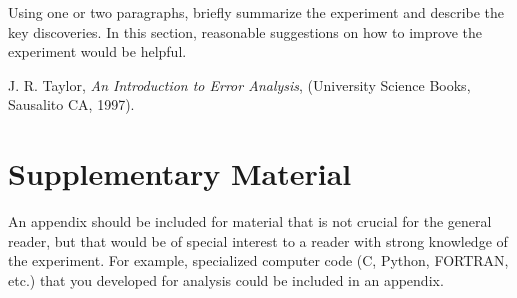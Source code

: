 \documentclass[twocolumn,secnumarabic,amssymb, nobibnotes, aps, pra]{revtex4}
\begin{document}
Using one or two paragraphs, briefly summarize the experiment and describe the key discoveries.  In this section, reasonable suggestions on how to improve the experiment would be helpful.

\begin{thebibliography}{5}
 J. R. Taylor, \textit{An Introduction to Error Analysis}, (University Science Books, Sausalito CA, 1997).
\end{thebibliography}


\appendix
\section{Supplementary Material}

An appendix should be included for material that is not crucial for the general reader, but that would be of special interest to a reader with strong knowledge of the experiment.  For example, specialized computer code (C, Python, FORTRAN, etc.) that you developed for analysis could be included in an appendix.
\end{document}
